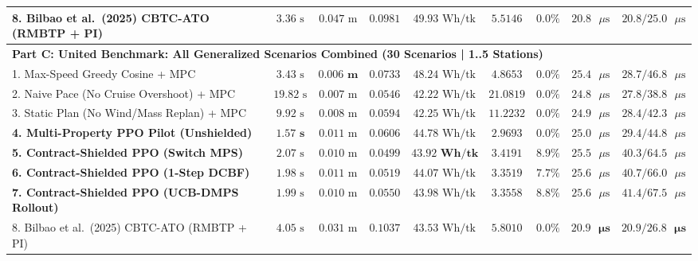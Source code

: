 \documentclass[10pt,a4paper]{article}
\begin{document}
\begin{table}[H]
{\begin{tabular}{lcccccccc}
8. Bilbao et al.\ (2025) CBTC-ATO (RMBTP + PI) \cite{bilbao2025} & $3.36\text{ s}$ & $0.047\text{ m}$ & $0.0981$ & $49.93\text{ Wh/tk}$ & $5.5146$ & $0.0\%$ & $20.8\text{ }\mu\text{s}$ & $20.8 / 25.0\text{ }\mu\text{s}$ \\
\midrule
\multicolumn{9}{l}{\textbf{Part C: United Benchmark: All Generalized Scenarios Combined (30 Scenarios | 1..5 Stations)}} \\
\midrule
1. Max-Speed Greedy Cosine + MPC & $3.43\text{ s}$ & $\mathbf{0.006\text{ m}}$ & $0.0733$ & $48.24\text{ Wh/tk}$ & $4.8653$ & $0.0\%$ & $25.4\text{ }\mu\text{s}$ & $28.7 / 46.8\text{ }\mu\text{s}$ \\
2. Naive Pace (No Cruise Overshoot) + MPC & $19.82\text{ s}$ & $0.007\text{ m}$ & $0.0546$ & $42.22\text{ Wh/tk}$ & $21.0819$ & $0.0\%$ & $24.8\text{ }\mu\text{s}$ & $27.8 / 38.8\text{ }\mu\text{s}$ \\
3. Static Plan (No Wind/Mass Replan) + MPC & $9.92\text{ s}$ & $0.008\text{ m}$ & $0.0594$ & $42.25\text{ Wh/tk}$ & $11.2232$ & $0.0\%$ & $24.9\text{ }\mu\text{s}$ & $28.4 / 42.3\text{ }\mu\text{s}$ \\
\textbf{4. Multi-Property PPO Pilot (Unshielded)} & $\mathbf{1.57\text{ s}}$ & $0.011\text{ m}$ & $0.0606$ & $44.78\text{ Wh/tk}$ & $\mathbf{2.9693}$ & $0.0\%$ & $25.0\text{ }\mu\text{s}$ & $29.4 / 44.8\text{ }\mu\text{s}$ \\
\textbf{5. Contract-Shielded PPO (Switch MPS)} & $2.07\text{ s}$ & $0.010\text{ m}$ & $\mathbf{0.0499}$ & $\mathbf{43.92\text{ Wh/tk}}$ & $3.4191$ & $8.9\%$ & $25.5\text{ }\mu\text{s}$ & $40.3 / 64.5\text{ }\mu\text{s}$ \\
\textbf{6. Contract-Shielded PPO (1-Step DCBF)} & $1.98\text{ s}$ & $0.011\text{ m}$ & $0.0519$ & $44.07\text{ Wh/tk}$ & $3.3519$ & $7.7\%$ & $25.6\text{ }\mu\text{s}$ & $40.7 / 66.0\text{ }\mu\text{s}$ \\
\textbf{7. Contract-Shielded PPO (UCB-DMPS Rollout)} & $1.99\text{ s}$ & $0.010\text{ m}$ & $0.0550$ & $43.98\text{ Wh/tk}$ & $3.3558$ & $8.8\%$ & $25.6\text{ }\mu\text{s}$ & $41.4 / 67.5\text{ }\mu\text{s}$ \\
8. Bilbao et al.\ (2025) CBTC-ATO (RMBTP + PI) \cite{bilbao2025} & $4.05\text{ s}$ & $0.031\text{ m}$ & $0.1037$ & $43.53\text{ Wh/tk}$ & $5.8010$ & $0.0\%$ & $\mathbf{20.9\text{ }\mu\text{s}}$ & $\mathbf{20.9 / 26.8\text{ }\mu\text{s}}$ \\
\bottomrule
\end{tabular}%
}
\end{table}
\end{document}
